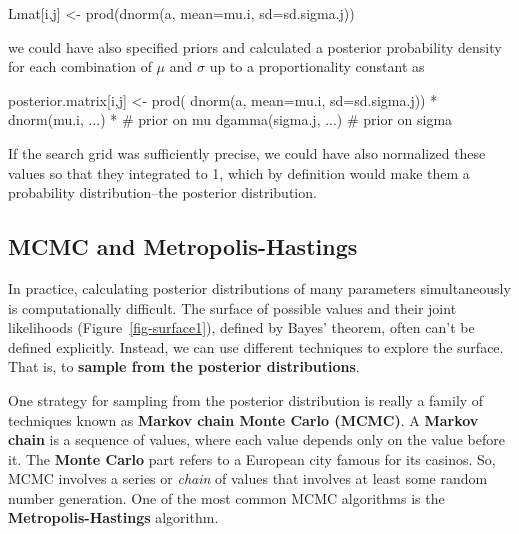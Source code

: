 \documentclass[
  13,
  letterpaper,
]{report}
\newenvironment{Shaded}{\begin{snugshade}}{\end{snugshade}}
\newcommand{\AttributeTok}[1]{\textcolor[rgb]{0.40,0.45,0.13}{#1}}
\newcommand{\CommentTok}[1]{\textcolor[rgb]{0.37,0.37,0.37}{#1}}
\newcommand{\FunctionTok}[1]{\textcolor[rgb]{0.28,0.35,0.67}{#1}}
\newcommand{\NormalTok}[1]{\textcolor[rgb]{0.00,0.23,0.31}{#1}}
\newcommand{\OtherTok}[1]{\textcolor[rgb]{0.00,0.23,0.31}{#1}}
\newcommand{\SpecialCharTok}[1]{\textcolor[rgb]{0.37,0.37,0.37}{#1}}
\begin{document}
\begin{Shaded}
\begin{Highlighting}[]
\NormalTok{Lmat[i,j] }\OtherTok{\textless{}{-}} \FunctionTok{prod}\NormalTok{(}\FunctionTok{dnorm}\NormalTok{(a, }\AttributeTok{mean=}\NormalTok{mu.i, }\AttributeTok{sd=}\NormalTok{sd.sigma.j))}
\end{Highlighting}
\end{Shaded}

we could have also specified priors and calculated a posterior
probability density for each combination of \(\mu\) and \(\sigma\) up to
a proportionality constant as

\begin{Shaded}
\begin{Highlighting}[]
\NormalTok{posterior.matrix[i,j] }\OtherTok{\textless{}{-}} \FunctionTok{prod}\NormalTok{(}
  \FunctionTok{dnorm}\NormalTok{(a, }\AttributeTok{mean=}\NormalTok{mu.i, }\AttributeTok{sd=}\NormalTok{sd.sigma.j)) }\SpecialCharTok{*} 
  \FunctionTok{dnorm}\NormalTok{(mu.i, ...) }\SpecialCharTok{*}   \CommentTok{\# prior on mu}
  \FunctionTok{dgamma}\NormalTok{(sigma.j, ...) }\CommentTok{\# prior on sigma}
\end{Highlighting}
\end{Shaded}

If the search grid was sufficiently precise, we could have also
normalized these values so that they integrated to 1, which by
definition would make them a probability distribution--the posterior
distribution.

\subsection{MCMC and Metropolis-Hastings}\label{sec-intro-bayes-mcmc}

In practice, calculating posterior distributions of many parameters
simultaneously is computationally difficult. The surface of possible
values and their joint likelihoods (Figure~\ref{fig-surface1}), defined
by Bayes' theorem, often can't be defined explicitly. Instead, we can
use different techniques to explore the surface. That is, to
\textbf{sample from the posterior distributions}.

One strategy for sampling from the posterior distribution is really a
family of techniques known as \textbf{Markov chain Monte Carlo (MCMC)}.
A \textbf{Markov chain} is a sequence of values, where each value
depends only on the value before it. The \textbf{Monte Carlo} part
refers to a European city famous for its casinos. So, MCMC involves a
series or \emph{chain} of values that involves at least some random
number generation. One of the most common MCMC algorithms is the
\textbf{Metropolis-Hastings} algorithm.
\end{document}
